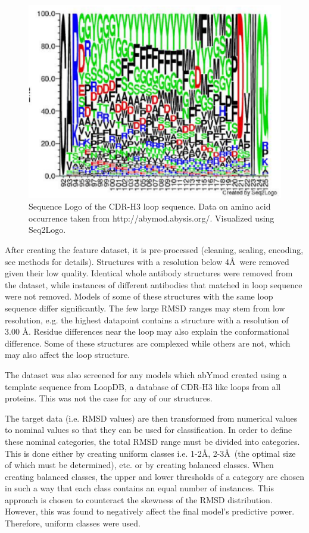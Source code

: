 \documentclass[12pt]{article}
\begin{document}
\begin{figure}
  \includegraphics[scale=0.9]{logo.eps}
  \caption {Sequence Logo of the CDR-H3 loop sequence. Data on amino
    acid occurrence taken from http://abymod.abysis.org/. Visualized
    using Seq2Logo.}
  \label{fig:logo}
\end{figure}

After creating the feature dataset, it is pre-processed (cleaning,
scaling, encoding, see methods for details). Structures with a
resolution below 4\AA\ were removed given their low quality. Identical
whole antibody structures were removed from the dataset, while
instances of different antibodies that matched in loop sequence were
not removed. Models of some of these structures with the same loop
sequence differ significantly. The few large RMSD ranges may stem from
low resolution, e.g. the highest datapoint contains a structure with a
resolution of 3.00 \AA.  Residue differences near the loop may also
explain the conformational difference. Some of these structures are
complexed while others are not, which may also affect the loop
structure.


The dataset was also screened for any models which abYmod created
using a template sequence from LoopDB, a database of CDR-H3 like loops
from all proteins. This was not the case for any of our structures.

The target data (i.e. RMSD values) are then transformed from numerical
values to nominal values so that they can be used for
classification. In order to define these nominal categories, the total
RMSD range must be divided into categories. This is done either by
creating uniform classes i.e. 1-2\AA, 2-3\AA\ (the optimal size of which
must be determined), etc. or by creating balanced classes. When
creating balanced classes, the upper and lower thresholds of a
category are chosen in such a way that each class contains an equal
number of instances. This approach is chosen to counteract the
skewness of the RMSD distribution. However, this was found to
negatively affect the final model's predictive power. Therefore,
uniform classes were used.
\end{document}
